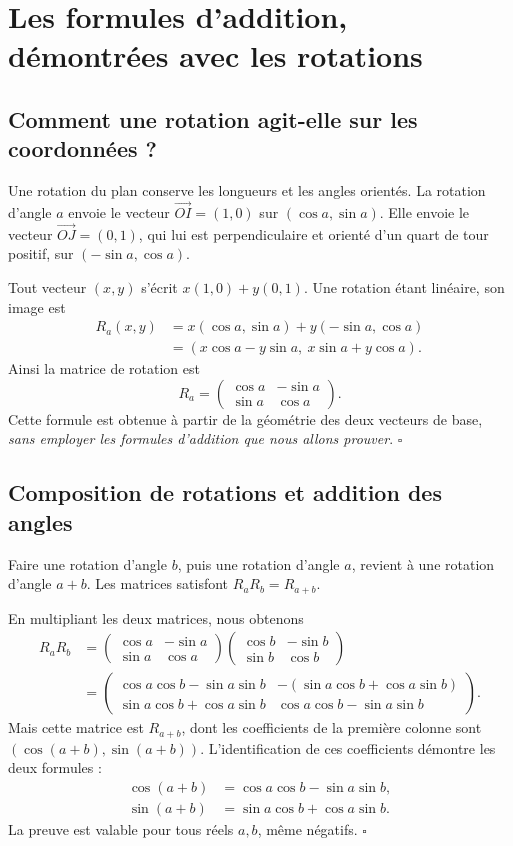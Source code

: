\documentclass[../cours_spe_trigo.tex]{subfiles}
\begin{document}
\setcounter{chapter}{6}
\chapter{Les formules d'addition, démontrées avec les rotations}
\section{Comment une rotation agit-elle sur les coordonnées ?}
Une rotation du plan conserve les longueurs et les angles orientés. La rotation d'angle $a$ envoie le vecteur $\vec{OI}=(1,0)$ sur $(\cos a,\sin a)$. Elle envoie le vecteur $\vec{OJ}=(0,1)$, qui lui est perpendiculaire et orienté d'un quart de tour positif, sur $(-\sin a,\cos a)$.
\begin{demonstration}
Tout vecteur $(x,y)$ s'écrit $x(1,0)+y(0,1)$. Une rotation étant linéaire, son image est
\[
\begin{aligned}
R_a(x,y)&=x(\cos a,\sin a)+y(-\sin a,\cos a)\\
&=(x\cos a-y\sin a,\ x\sin a+y\cos a).
\end{aligned}
\]
Ainsi la matrice de rotation est
\[\boxed{R_a=\begin{pmatrix}\cos a&-\sin a\\\sin a&\cos a\end{pmatrix}.}\]
Cette formule est obtenue à partir de la géométrie des deux vecteurs de base, \emph{sans employer les formules d'addition que nous allons prouver}. $\square$
\end{demonstration}
\section{Composition de rotations et addition des angles}
Faire une rotation d'angle $b$, puis une rotation d'angle $a$, revient à une rotation d'angle $a+b$. Les matrices satisfont $R_aR_b=R_{a+b}$.
\begin{demonstration}
En multipliant les deux matrices, nous obtenons
\[
\begin{aligned}
R_aR_b
&=\begin{pmatrix}\cos a&-\sin a\\\sin a&\cos a\end{pmatrix}
\begin{pmatrix}\cos b&-\sin b\\\sin b&\cos b\end{pmatrix}\\
&=\begin{pmatrix}
\cos a\cos b-\sin a\sin b&-(\sin a\cos b+\cos a\sin b)\\
\sin a\cos b+\cos a\sin b&\cos a\cos b-\sin a\sin b
\end{pmatrix}.
\end{aligned}
\]
Mais cette matrice est $R_{a+b}$, dont les coefficients de la première colonne sont $(\cos(a+b),\sin(a+b))$. L'identification de ces coefficients démontre les deux formules :
\[
\boxed{\begin{aligned}
\cos(a+b)&=\cos a\cos b-\sin a\sin b,\\
\sin(a+b)&=\sin a\cos b+\cos a\sin b.
\end{aligned}}
\]
La preuve est valable pour tous réels $a,b$, même négatifs. $\square$
\end{demonstration}
\end{document}
